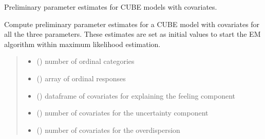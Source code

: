 \documentclass[letterpaper,10pt,english]{sphinxmanual}
\begin{document}

\begin{fulllineitems}
\label{\detokenize{cubmods:cubmods.cube_ywz.init_theta}}
\pysigstartsignatures
{}
\pysigstopsignatures
\sphinxAtStartPar
Preliminary parameter estimates for CUBE models with covariates.

\sphinxAtStartPar
Compute preliminary parameter estimates for a CUBE model with covariates for all the three parameters. 
These estimates are set as initial values to start the E\sphinxhyphen{}M algorithm within maximum likelihood estimation.
\begin{quote}\begin{description}
\begin{itemize}
\item {} 
\sphinxAtStartPar
{} () \textendash{} number of ordinal categories

\item {} 
\sphinxAtStartPar
{} () \textendash{} array of ordinal responses

\item {} 
\sphinxAtStartPar
{} () \textendash{} dataframe of covariates for explaining the feeling component

\item {} 
\sphinxAtStartPar
{} () \textendash{} number of covariates for the uncertainty component

\item {} 
\sphinxAtStartPar
{} () \textendash{} number of covariates for the overdispersion


\end{itemize}
\end{description}
\end{quote}
\end{fulllineitems}
\end{document}

